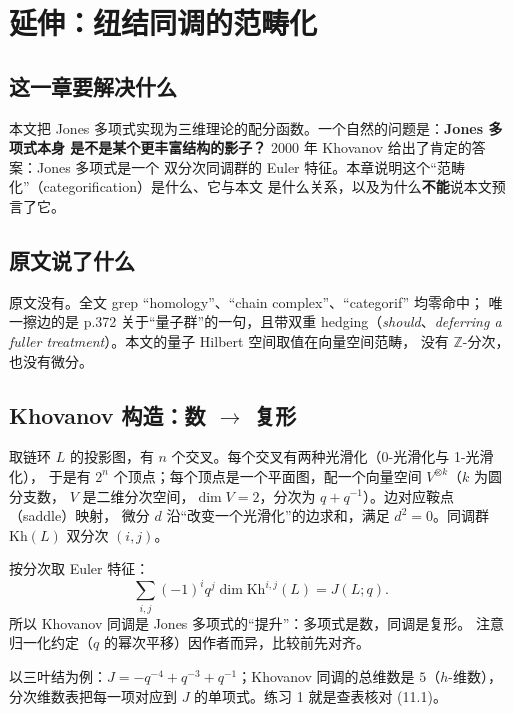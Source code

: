 \section{延伸：纽结同调的范畴化}\label{sec:categorification}

\subsection{这一章要解决什么}
本文把 Jones 多项式实现为三维理论的配分函数。一个自然的问题是：\textbf{Jones 多项式本身
是不是某个更丰富结构的影子？} 2000 年 Khovanov 给出了肯定的答案：Jones 多项式是一个
双分次同调群的 Euler 特征。本章说明这个“范畴化”（categorification）是什么、它与本文
是什么关系，以及为什么\textbf{不能}说本文预言了它。

\subsection{原文说了什么}
原文没有。全文 grep “homology”、“chain complex”、“categorif” 均零命中；
唯一擦边的是 p.372 关于“量子群”的一句，且带双重 hedging（\emph{should}、\emph{deferring a
fuller treatment}）。本文的量子 Hilbert 空间取值在向量空间范畴，
没有 $\mathbb Z$-分次，也没有微分。

\subsection{Khovanov 构造：数 $\to$ 复形}
取链环 $L$ 的投影图，有 $n$ 个交叉。每个交叉有两种光滑化（0-光滑化与 1-光滑化），
于是有 $2^n$ 个顶点；每个顶点是一个平面图，配一个向量空间 $V^{\otimes k}$（$k$ 为圆分支数，
$V$ 是二维分次空间，$\dim V=2$，分次为 $q+q^{-1}$）。边对应鞍点（saddle）映射，
微分 $d$ 沿“改变一个光滑化”的边求和，满足 $d^2=0$。同调群 $\mathrm{Kh}(L)$ 双分次 $(i,j)$。
\begin{keypoint}
按分次取 Euler 特征：
\begin{equation}
\sum_{i,j}(-1)^i q^j\dim \mathrm{Kh}^{i,j}(L)=J(L;q). \tag{11.1}
\end{equation}
所以 Khovanov 同调是 Jones 多项式的“提升”：多项式是数，同调是复形。
注意归一化约定（$q$ 的幂次平移）因作者而异，比较前先对齐。
\end{keypoint}
以三叶结为例：$J=-q^{-4}+q^{-3}+q^{-1}$；Khovanov 同调的总维数是 $5$（$h$-维数），
分次维数表把每一项对应到 $J$ 的单项式。练习 1 就是查表核对 (11.1)。

